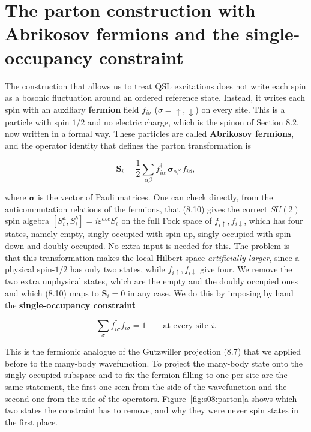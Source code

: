 \section{The parton construction with Abrikosov fermions and the single-occupancy constraint}

The construction that allows us to treat QSL excitations does not write each spin as a bosonic
fluctuation around an ordered reference state. Instead, it writes each spin with an auxiliary
\textbf{fermion} field $f_{i\sigma}$ ($\sigma=\uparrow,\downarrow$) on every site. This is a
particle with spin $1/2$ and no electric charge, which is the spinon of Section 8.2, now written in
a formal way. These particles are called \textbf{Abrikosov fermions}, and the operator identity
that defines the parton transformation is

\begin{equation}
\mathbf S_i = \frac12 \sum_{\alpha\beta} f_{i\alpha}^\dagger\, \boldsymbol\sigma_{\alpha\beta}\,
f_{i\beta},
\end{equation}

where $\boldsymbol\sigma$ is the vector of Pauli matrices. One can check directly, from the
anticommutation relations of the fermions, that (8.10) gives the correct $SU(2)$ spin algebra
$[S_i^a,S_i^b] = i\varepsilon^{abc}S_i^c$ on the full Fock space of
$f_{i\uparrow},f_{i\downarrow}$, which has four states, namely empty, singly occupied with spin up,
singly occupied with spin down and doubly occupied. No extra input is needed for this. The problem
is that this transformation makes the local Hilbert space \emph{artificially larger}, since a
physical spin-$1/2$ has only two states, while $f_{i\uparrow},f_{i\downarrow}$ give four. We remove
the two extra unphysical states, which are the empty and the doubly occupied ones and which (8.10)
maps to $\mathbf S_i=0$ in any case. We do this by imposing by hand the
\textbf{single-occupancy constraint}

\begin{equation}
\sum_\sigma f_{i\sigma}^\dagger f_{i\sigma} = 1 \qquad \text{at every site } i.
\end{equation}

This is the fermionic analogue of the Gutzwiller projection (8.7) that we applied before to the
many-body wavefunction. To project the many-body state onto the singly-occupied subspace and to fix
the fermion filling to one per site are the same statement, the first one seen from the side of
the wavefunction and the second one from the side of the operators.
Figure~\ref{fig:s08:parton}a shows which two states the constraint has to remove, and why they were
never spin states in the first place.

